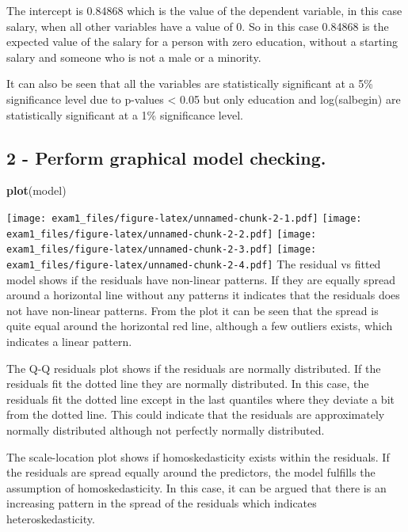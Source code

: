 \documentclass[
]{article}
\newenvironment{Shaded}{\begin{snugshade}}{\end{snugshade}}
\newcommand{\FunctionTok}[1]{\textcolor[rgb]{0.13,0.29,0.53}{\textbf{#1}}}
\newcommand{\NormalTok}[1]{#1}
\begin{document}
The intercept is 0.84868 which is the value of the dependent variable,
in this case salary, when all other variables have a value of 0. So in
this case 0.84868 is the expected value of the salary for a person with
zero education, without a starting salary and someone who is not a male
or a minority.

It can also be seen that all the variables are statistically significant
at a 5\% significance level due to p-values \textless{} 0.05 but only
education and log(salbegin) are statistically significant at a 1\%
significance level.

\subsection{2 - Perform graphical model
checking.}\label{perform-graphical-model-checking.}

\begin{Shaded}
\begin{Highlighting}[]
\FunctionTok{plot}\NormalTok{(model)}
\end{Highlighting}
\end{Shaded}

\texttt{[image: exam1\_files/figure-latex/unnamed-chunk-2-1.pdf]}
\texttt{[image: exam1\_files/figure-latex/unnamed-chunk-2-2.pdf]}
\texttt{[image: exam1\_files/figure-latex/unnamed-chunk-2-3.pdf]}
\texttt{[image: exam1\_files/figure-latex/unnamed-chunk-2-4.pdf]} The
residual vs fitted model shows if the residuals have non-linear
patterns. If they are equally spread around a horizontal line without
any patterns it indicates that the residuals does not have non-linear
patterns. From the plot it can be seen that the spread is quite equal
around the horizontal red line, although a few outliers exists, which
indicates a linear pattern.

The Q-Q residuals plot shows if the residuals are normally distributed.
If the residuals fit the dotted line they are normally distributed. In
this case, the residuals fit the dotted line except in the last
quantiles where they deviate a bit from the dotted line. This could
indicate that the residuals are approximately normally distributed
although not perfectly normally distributed.

The scale-location plot shows if homoskedasticity exists within the
residuals. If the residuals are spread equally around the predictors,
the model fulfills the assumption of homoskedasticity. In this case, it
can be argued that there is an increasing pattern in the spread of the
residuals which indicates heteroskedasticity.
\end{document}
